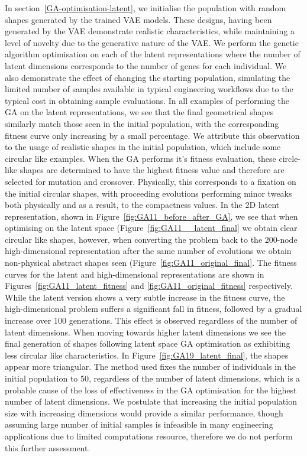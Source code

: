 \documentclass{article}
\begin{document}
In section~\ref{GA-optimisation-latent}, we initialise the population with random shapes generated by the trained VAE models. These designs, having been generated by the VAE demonstrate realistic characteristics, while maintaining a level of novelty due to the generative nature of the VAE. We perform the genetic algorithm optimisation on each of the latent representations where the number of latent dimensions corresponds to the number of genes for each individual. We also demonstrate the effect of changing the starting population, simulating the limited number of samples available in typical engineering workflows due to the typical cost in obtaining sample evaluations. In all examples of performing the GA on the latent representations, we see that the final geometrical shapes similarly match those seen in the initial population, with the corresponding fitness curve only increasing by a small percentage. We attribute this observation to the usage of realistic shapes in the initial population, which include some circular like examples. When the GA performs it's fitness evaluation, these circle-like shapes are determined to have the highest fitness value and therefore are selected for mutation and crossover. Physically, this corresponds to a fixation on the initial circular shapes, with proceeding evolutions performing minor tweaks both physically and as a result, to the compactness values. In the 2D latent representation, shown in Figure~\ref{fig:GA11_before_after_GA}, we see that when optimising on the latent space (Figure~\ref{fig:GA11__latent_final} we obtain clear circular like shapes, however, when converting the problem back to the 200-node high-dimensional representation after the same number of evolutions we obtain non-physical abstract shapes seen (Figure~\ref{fig:GA11_original_final}. The fitness curves for the latent and high-dimensional representations are shown in Figures~\ref{fig:GA11_latent_fitness} and \ref{fig:GA11_original_fitness} respectively. While the latent version shows a very subtle increase in the fitness curve, the high-dimensional problem suffers a significant fall in fitness, followed by a gradual increase over 100 generations. This effect is observed regardless of the number of latent dimensions. When moving towards higher latent dimensions we see the final generation of shapes following latent space GA optimisation as exhibiting less circular like characteristics. In Figure~\ref{fig:GA19_latent_final}, the shapes appear more triangular. The method used fixes the number of individuals in the initial population to 50, regardless of the number of latent dimensions, which is a probable cause of the loss of effectiveness in the GA optimisation for the highest number of latent dimensions. We postulate that increasing the initial population size with increasing dimensions would provide a similar performance, though assuming large number of initial samples is infeasible in many engineering applications due to limited computations resource, therefore we do not perform this further assessment.
\end{document}
